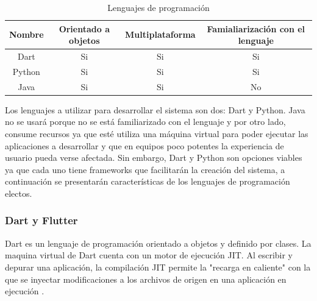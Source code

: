 \begin{table}[!htb]
\begin{tabular}{|c|c|c|c|}
\hline
\rowcolor[HTML]{3531FF} 
{\color[HTML]{FFFFFF} Nombre} & {\color[HTML]{FFFFFF} Orientado a objetos} & {\color[HTML]{FFFFFF} Multiplataforma} & {\color[HTML]{FFFFFF} Famialiarización con el lenguaje} \\ \hline
Dart & Si & Si & Si \\ \hline
Python & Si & Si & Si \\ \hline
Java & Si & Si & No \\ \hline
\end{tabular}
\caption{Lenguajes de programación}
\label{table:Programacion}
\end{table}
Los lenguajes a utilizar para desarrollar el sistema son dos: Dart y Python. Java no se usará porque no se está familiarizado con el lenguaje y por otro lado, consume recursos ya que esté utiliza una máquina virtual para poder ejecutar las aplicaciones a desarrollar y que en equipos poco potentes la experiencia de usuario pueda verse afectada. Sin embargo, Dart y Python son opciones viables ya que cada uno tiene frameworks que facilitarán la creación del sistema, a continuación se presentarán características de los lenguajes de programación electos.

\subsubsection{Dart y Flutter}
Dart es un lenguaje de programación orientado a objetos y definido por clases. La maquina virtual de Dart cuenta con un motor de ejecución \acrfull{JIT}. Al escribir y depurar una aplicación, la compilación \acrshort{JIT} permite la "recarga en caliente" con la que se inyectar modificaciones a los archivos de origen en una aplicación en ejecución \cite{Vega2019}. 

